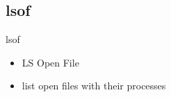 \subsection{lsof}

\begin{frame}[fragile]{lsof}
  \begin{itemize}
    \pause \item LS Open File
    \pause \item list open files with their processes
  \end{itemize}
\end{frame}


